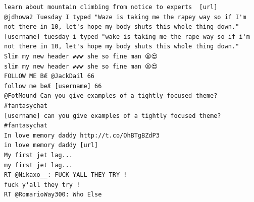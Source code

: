 \documentclass[twocolumn,10pt]{article}
\begin{document}
\begin{lstlisting}
learn about mountain climbing from notice to experts  [url]
@jdhowa2 Tuesday I typed "Waze is taking me the rapey way so if I'm not there in 10, let's hope my body shuts this whole thing down."
[username] tuesday i typed "wake is taking me the rape way so if i'm not there in 10, let's hope my body shuts this whole thing down."
Slim my new header 💕💕💕 she so fine man 😫😍
slim my new header 💕💕💕 she so fine man 😫😍
FOLLOW ME BÆ @JackDail 66
follow me beÆ [username] 66
@FotMound Can you give examples of a tightly focused theme? #fantasychat
[username] can you give examples of a tightly focused theme? #fantasychat
In love memory daddy http://t.co/OhBTgBZdP3
in love memory daddy [url]
My first jet lag...
my first jet lag...
RT @Nikaxo__: FUCK YALL THEY TRY !
fuck y'all they try !
RT @RomarioWay300: Who Else
\end{lstlisting}


\end{document}
